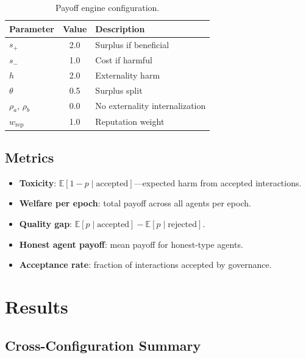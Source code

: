 \documentclass[11pt]{article}
\begin{document}
\begin{table}[H]
\centering
\caption{Payoff engine configuration.}
\label{tab:payoff}
\small
\begin{tabular}{@{}lcl@{}}
\toprule
Parameter & Value & Description \\
\midrule
$s_+$ & 2.0 & Surplus if beneficial \\
$s_-$ & 1.0 & Cost if harmful \\
$h$ & 2.0 & Externality harm \\
$\theta$ & 0.5 & Surplus split \\
$\rho_a$, $\rho_b$ & 0.0 & No externality internalization \\
$w_{\text{rep}}$ & 1.0 & Reputation weight \\
\bottomrule
\end{tabular}
\end{table}

\subsection{Metrics}

\begin{itemize}
    \item \textbf{Toxicity}: $\mathbb{E}[1-p \mid \text{accepted}]$---expected harm from accepted interactions.
    \item \textbf{Welfare per epoch}: total payoff across all agents per epoch.
    \item \textbf{Quality gap}: $\mathbb{E}[p \mid \text{accepted}] - \mathbb{E}[p \mid \text{rejected}]$.
    \item \textbf{Honest agent payoff}: mean payoff for honest-type agents.
    \item \textbf{Acceptance rate}: fraction of interactions accepted by governance.
\end{itemize}

\section{Results}

\subsection{Cross-Configuration Summary}
\end{document}
